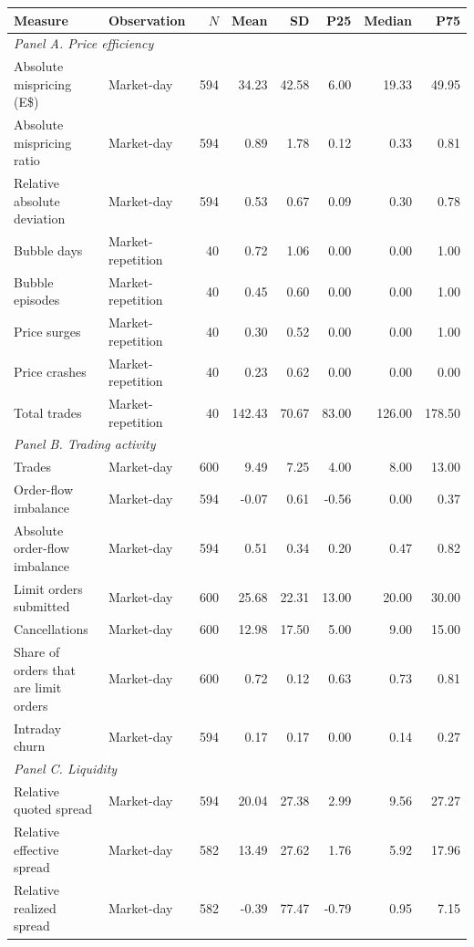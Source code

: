 \begin{tabular}{llrrrrrr}
\toprule
Measure & Observation & $N$ & Mean & SD & P25 & Median & P75 \\
\midrule
\multicolumn{8}{l}{\textit{Panel A. Price efficiency}} \\
Absolute mispricing (E\$) & Market-day & 594 & 34.23 & 42.58 & 6.00 & 19.33 & 49.95 \\
Absolute mispricing ratio & Market-day & 594 & 0.89 & 1.78 & 0.12 & 0.33 & 0.81 \\
Relative absolute deviation & Market-day & 594 & 0.53 & 0.67 & 0.09 & 0.30 & 0.78 \\
Bubble days & Market-repetition & 40 & 0.72 & 1.06 & 0.00 & 0.00 & 1.00 \\
Bubble episodes & Market-repetition & 40 & 0.45 & 0.60 & 0.00 & 0.00 & 1.00 \\
Price surges & Market-repetition & 40 & 0.30 & 0.52 & 0.00 & 0.00 & 1.00 \\
Price crashes & Market-repetition & 40 & 0.23 & 0.62 & 0.00 & 0.00 & 0.00 \\
Total trades & Market-repetition & 40 & 142.43 & 70.67 & 83.00 & 126.00 & 178.50 \\
\multicolumn{8}{l}{\textit{Panel B. Trading activity}} \\
Trades & Market-day & 600 & 9.49 & 7.25 & 4.00 & 8.00 & 13.00 \\
Order-flow imbalance & Market-day & 594 & -0.07 & 0.61 & -0.56 & 0.00 & 0.37 \\
Absolute order-flow imbalance & Market-day & 594 & 0.51 & 0.34 & 0.20 & 0.47 & 0.82 \\
Limit orders submitted & Market-day & 600 & 25.68 & 22.31 & 13.00 & 20.00 & 30.00 \\
Cancellations & Market-day & 600 & 12.98 & 17.50 & 5.00 & 9.00 & 15.00 \\
Share of orders that are limit orders & Market-day & 600 & 0.72 & 0.12 & 0.63 & 0.73 & 0.81 \\
Intraday churn & Market-day & 594 & 0.17 & 0.17 & 0.00 & 0.14 & 0.27 \\
\multicolumn{8}{l}{\textit{Panel C. Liquidity}} \\
Relative quoted spread & Market-day & 594 & 20.04 & 27.38 & 2.99 & 9.56 & 27.27 \\
Relative effective spread & Market-day & 582 & 13.49 & 27.62 & 1.76 & 5.92 & 17.96 \\
Relative realized spread & Market-day & 582 & -0.39 & 77.47 & -0.79 & 0.95 & 7.15 \\

\end{tabular}
